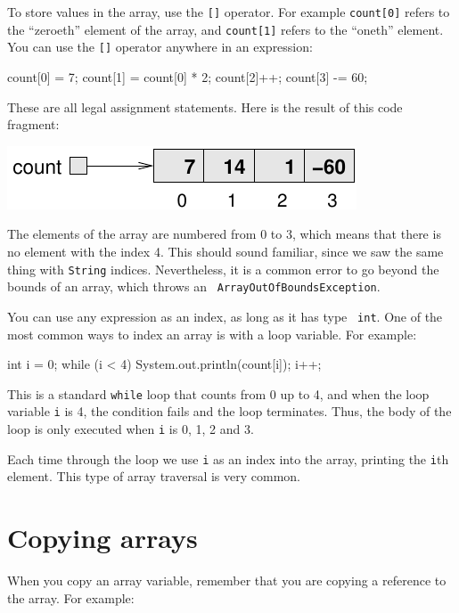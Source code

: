 To store values in the array, use the
{\tt []} operator.  For example {\tt count[0]} refers to the
``zeroeth'' element of the array, and {\tt count[1]} refers to the
``oneth'' element.  You can use the {\tt []} operator anywhere in an
expression:

\begin{code}
    count[0] = 7;
    count[1] = count[0] * 2;
    count[2]++;
    count[3] -= 60;
\end{code}
%
These are all legal assignment statements.  Here is the
result of this code fragment:


\includegraphics{figs/array2.pdf}


The elements of the array
are numbered from 0 to 3, which means that there is no element with
the index 4.  This should sound familiar, since we saw the same thing
with {\tt String} indices.  Nevertheless, it is a common error to go
beyond the bounds of an array, which throws an {\tt
ArrayOutOfBoundsException}.

You can use any expression as an index, as long as it has type {\tt
int}.  One of the most common ways to index an array is with a loop
variable.  For example:

\begin{code}
    int i = 0;
    while (i < 4) {
        System.out.println(count[i]);
        i++;
    }
\end{code}
%
This is a standard {\tt while} loop that counts from 0
up to 4, and when the loop variable {\tt i} is 4, the
condition fails and the loop terminates.  Thus, the body
of the loop is only executed when {\tt i} is 0, 1, 2 and 3.


Each time through the loop we use {\tt i} as an index into
the array, printing the {\tt i}th element.  This type of
array traversal is very common.


\section{Copying arrays}

When you copy an array variable, remember that you are
copying a reference to the array.  For example:

